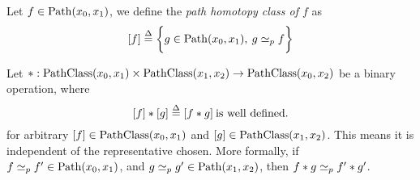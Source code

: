 \documentclass[../main-manifolds.tex]{subfiles}
\providecommand{\phtp}{\simeq_p} %
\begin{document}
\begin{definition}
    Let $ f\in\Path[x_0,x_1]$, we define the \emph{path homotopy class of $f$} as 
    \[
        [f]\defined\bigset{g\in\Path[x_0,x_1],\: g\phtp f}
    \]
\end{definition}
\begin{definition}\label{munkres:product-of-pathclasses}
    Let $\cnv: \PathClass[x_0,x_1]\times\PathClass[x_1,x_2]\to \PathClass[x_0,x_2]$ be a binary operation, where 
    \[
        [f]\ast[g]\overset{\Delta}{=} [f\ast g]\: {\text{is well defined.}}
    \]
    for arbitrary $[f]\in \PathClass[x_0,x_1]$ and $[g]\in \PathClass[x_1,x_2]$. This means it is independent of the representative chosen. More formally, if $f\phtp f'\in\Path[x_0,x_1]$, and $g\phtp g'\in\Path[x_1,x_2]$, then $f\cnv g\phtp f'\cnv g'$.
\end{definition}
\end{document}
